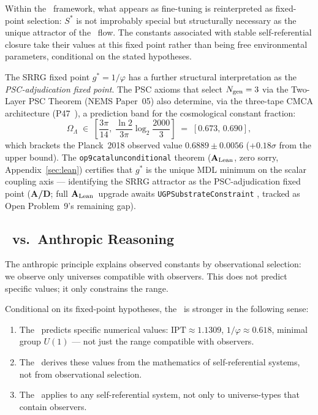 \documentclass[11pt]{article}
\theoremstyle{remark}
\newcommand{\SRRG}{\text{SRRG}}
\newcommand{\CatAL}{\ensuremath{\textbf{A}_{\rm Lean}}}
\newcommand{\CatAD}{\textbf{A/D}}
\newcommand{\OmL}{\Omega_\Lambda}
\newcommand{\IPT}{\mathrm{IPT}}
\newcommand{\lean}[1]{%
  \penalty-100
  \begingroup
  \def\_{\textunderscore\allowbreak}%
  \texttt{#1}%
  \endgroup
}
\newcommand{\Sstar}{S^*}
\newcommand{\goldenratio}{\varphi}
\begin{document}
Within the \SRRG\ framework, what appears as fine-tuning is reinterpreted as
fixed-point selection: $\Sstar$ is not improbably special but structurally
necessary as the unique attractor of the \SRRG\ flow.  The constants associated
with stable self-referential closure take their values at this fixed point rather
than being free environmental parameters, conditional on the stated hypotheses.

The SRRG fixed point $g^* = 1/\varphi$ has a further structural
interpretation as the \emph{PSC-adjudication fixed point}.
The PSC axioms that select $N_{\rm gen}=3$ via the Two-Layer PSC Theorem
(NEMS Paper~05) also determine, via the three-tape CMCA architecture
(P47~\cite{SpivackGTECosmology}), a prediction band for the cosmological
constant fraction:
\begin{equation}
  \OmL \;\in\; \left[\frac{3\pi}{14},\; \frac{\ln 2}{3\pi}\log_2\!\frac{2000}{3}\right]
  \;=\; [0.673,\, 0.690],
\end{equation}
which brackets the Planck~2018 observed value $0.6889 \pm 0.0056$
(+$0.18\sigma$ from the upper bound).
The \lean{op9\_catal\_unconditional} theorem (\CatAL, zero sorry,
Appendix~\ref{sec:lean}) certifies that $g^*$ is the unique MDL minimum on
the scalar coupling axis --- identifying the SRRG attractor as the
PSC-adjudication fixed point (\CatAD; full \CatAL\ upgrade awaits
\lean{UGPSubstrateConstraint}, tracked as Open Problem~9's remaining gap).

\subsection{\SRRG\ vs.\ Anthropic Reasoning}
\label{sec:anthropic}

The anthropic principle \cite{Barrow1986} explains observed constants by observational
selection: we observe only universes compatible with observers. This does not
predict specific values; it only constrains the range.

Conditional on its fixed-point hypotheses, the \SRRG\ is stronger in the following sense:
\begin{enumerate}[leftmargin=2.5em]
\item The \SRRG\ predicts specific numerical values: $\IPT \approx 1.1309$,
  $1/\goldenratio \approx 0.618$, minimal group $U(1)$ --- not just the range
  compatible with observers.
\item The \SRRG\ derives these values from the mathematics of self-referential
  systems, not from observational selection.
\item The \SRRG\ applies to any self-referential system, not only to universe-types
  that contain observers.
\end{enumerate}
\end{document}
